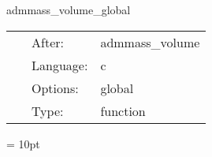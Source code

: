 \vspace{5mm}


\hspace{5mm} admmass\_volume\_global 

\hspace{5mm}{\it calculate the admmass using a volume integral: global routine } 


\hspace{5mm}

 \begin{tabular*}{160mm}{cll} 
~ & After:  & admmass\_volume \\ 
~ & Language:  & c \\ 
~ & Options:  & global \\ 
~ & Type:  & function \\ 
\end{tabular*} 



\vspace{5mm}\parskip = 10pt 
